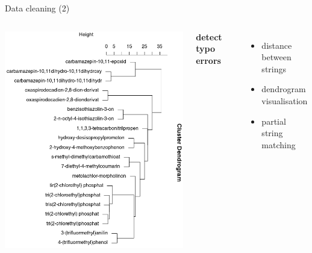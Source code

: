\documentclass[8pt,ignorenonframetext,]{beamer}
\providecommand{\tightlist}{%
  \setlength{\itemsep}{0pt}\setlength{\parskip}{0pt}}
\newcommand{\columnsbegin}{\begin{columns}}
\newcommand{\columnsend}{\end{columns}}
\begin{document}
\begin{frame}{Data cleaning (2)}

\columnsbegin
{}
\includegraphics{imgPres/data_cleaning_dendrogram.png}

\textbf{detect typo errors}

\begin{itemize}
\tightlist
\item
  distance between strings
\item
  dendrogram visualisation
\item
  partial string matching
\end{itemize}

\columnsend

\end{frame}
\end{document}
